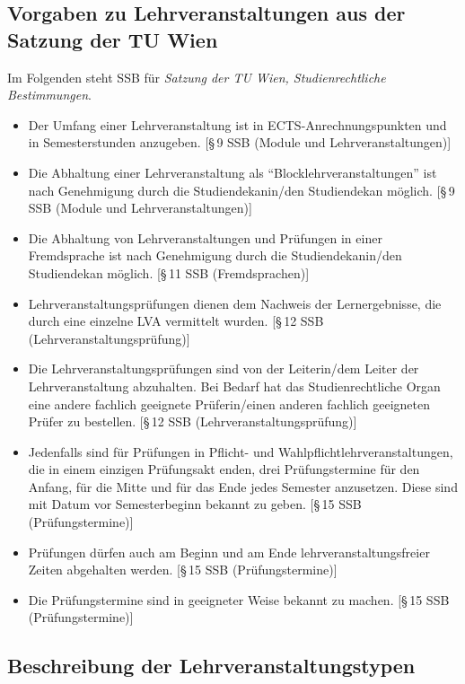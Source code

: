 \subsection*{Vorgaben zu Lehrveranstaltungen aus der Satzung der TU
  Wien}

Im Folgenden steht SSB für \emph{Satzung der TU Wien, Studienrechtliche Bestimmungen}.
\begin{itemize}
\item Der Umfang einer Lehrveranstaltung ist in
  ECTS-Anrechnungspunkten und in Semesterstunden anzugeben. [§\,9 SSB
  (Module und Lehrveranstaltungen)]
\item Die Abhaltung einer Lehrveranstaltung als "`Blocklehrveranstaltungen"'
  ist nach Genehmigung durch die Studiendekanin/den Studiendekan möglich.
  [§\,9 SSB (Module und Lehrveranstaltungen)]
\item Die Abhaltung von Lehrveranstaltungen und Prüfungen in einer
  Fremdsprache ist nach Genehmigung durch die Studiendekanin/den
  Studiendekan möglich. [§\,11 SSB (Fremdsprachen)]
\item Lehrveranstaltungsprüfungen dienen dem Nachweis der
  Lernergebnisse, die durch eine einzelne LVA vermittelt
  wurden. [§\,12 SSB (Lehrveranstaltungsprüfung)]
\item Die Lehrveranstaltungsprüfungen sind von der Leiterin/dem Leiter
  der Lehrveranstaltung abzuhalten.  Bei Bedarf hat das
  Studienrechtliche Organ eine andere fachlich geeignete
  Prüferin/einen anderen fachlich geeigneten Prüfer zu
  bestellen. [§\,12 SSB (Lehrveranstaltungsprüfung)]
\item Jedenfalls sind für Prüfungen in Pflicht- und
  Wahlpflichtlehrveranstaltungen, die in einem einzigen Prüfungsakt
  enden, drei Prüfungstermine für den Anfang, für die Mitte und für
  das Ende jedes Semester anzusetzen. Diese sind mit Datum vor
  Semesterbeginn bekannt zu geben. [§\,15 SSB (Prüfungstermine)]
\item Prüfungen dürfen auch am Beginn und am Ende lehrveranstaltungsfreier Zeiten abgehalten werden. [§\,15 SSB (Prüfungstermine)]
\item Die Prüfungstermine sind in geeigneter Weise bekannt zu
  machen. [§\,15 SSB (Prüfungstermine)]
\end{itemize}

\subsection*{Beschreibung der Lehrveranstaltungstypen}
\label{sec:LVA-Typ}

